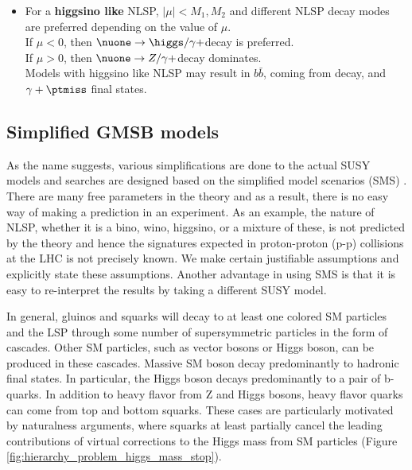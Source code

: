 \begin{itemize}
\item For a \textbf{higgsino like} NLSP, $|\mu| < M_1,M_2$ and different NLSP decay modes are preferred depending on the value of $\mu$.\\
If $\mu < 0$, then $\nuone \rightarrow \higgs/\gamma + $\grav decay is preferred.\\
If $\mu > 0$, then $\nuone \rightarrow Z/\gamma + $\grav decay dominates.\\
Models with higgsino like NLSP may result in $b\bar{b}$, coming from \higgs decay, and $\gamma+\ptmiss$ final states.
\end{itemize}

\subsection{Simplified GMSB models}\label{sec:SMSgmsb}
As the name suggests, various simplifications are done to the actual SUSY models and searches are designed based on the simplified model scenarios (SMS) \cite{bib-sms-1,bib-sms-2,bib-sms-3,bib-sms-4,Chatrchyan:2013sza}. There are many free parameters in the theory and as a result, there is no easy way of making a prediction in an experiment. As an example, the nature of NLSP, whether it is a bino, wino, higgsino, or a mixture of these, is not predicted by the theory and hence the signatures expected in proton-proton (p-p) collisions at the LHC is not precisely known. We make certain justifiable assumptions and explicitly state these assumptions. Another advantage in using SMS is that it is easy to re-interpret the results by taking a different SUSY model.

In general, gluinos and squarks will decay to at least one colored SM particles and the LSP through some number of
supersymmetric particles in the form of cascades.  Other SM particles, such as vector bosons or Higgs boson, can be 
produced in these cascades.  Massive SM boson decay predominantly to hadronic final states.  In particular, 
the Higgs boson decays predominantly to a pair of b-quarks.  In addition to heavy flavor from Z and Higgs bosons, 
heavy flavor quarks can come from top and bottom squarks.  These cases are particularly motivated by naturalness 
arguments, where squarks at least partially cancel the leading contributions of virtual corrections to the 
Higgs mass from SM particles (Figure \ref{fig:hierarchy_problem_higgs_mass_stop}).  

